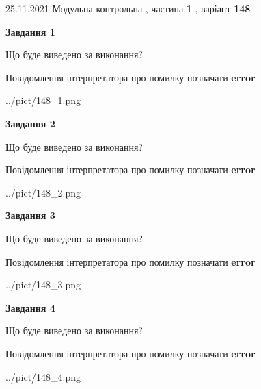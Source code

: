 \documentclass[10pt, ukrainian]{article}
\begin{document}
{25.11.2021 Модульна контрольна , частина \textbf { 1 }, варіант  \No \textbf { 148 }\par}
{
\begin {large}

{\begin {center}\textbf{Завдання 1}\end {center}}\par
Що буде виведено за виконання? \par
Повідомлення інтерпретатора про помилку позначати \textbf{error}

\begin{center}
	{../pict/148_1.png}
\end{center}
\newpage

{\begin {center}\textbf{Завдання 2}\end {center}}\par
Що буде виведено за виконання? \par
Повідомлення інтерпретатора про помилку позначати \textbf{error}

\begin{center}
	{../pict/148_2.png}
\end{center}
\newpage

{\begin {center}\textbf{Завдання 3}\end {center}}\par
Що буде виведено за виконання? \par
Повідомлення інтерпретатора про помилку позначати \textbf{error}

\begin{center}
	{../pict/148_3.png}
\end{center}
\newpage

{\begin {center}\textbf{Завдання 4}\end {center}}\par
Що буде виведено за виконання? \par
Повідомлення інтерпретатора про помилку позначати \textbf{error}

\begin{center}
	{../pict/148_4.png}
\end{center}
\newpage


\end{large}}
\end{document}
